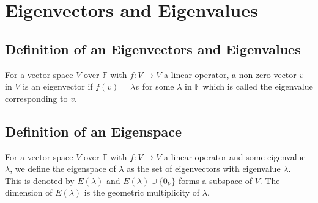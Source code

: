\documentclass[a4paper, 12pt, twoside]{article}
\begin{document}
\section{Eigenvectors and Eigenvalues}

\subsection{Definition of an Eigenvectors and Eigenvalues}

For a vector space $V$ over $\mathbb{F}$ with $f: V \to V$ a 
linear operator, a non-zero vector $v$ in $V$ is an eigenvector
if $f(v) = \lambda v$ for some $\lambda$ in $\mathbb{F}$ which is
called the eigenvalue corresponding to $v$.

\subsection{Definition of an Eigenspace}

For a vector space $V$ over $\mathbb{F}$ with $f: V \to V$ a 
linear operator and some eigenvalue $\lambda$, we define the
eigenspace of $\lambda$ as the set of eigenvectors with eigenvalue
$\lambda$.
\\[\baselineskip]
This is denoted by $E(\lambda)$ and $E(\lambda)\cup\{0_{V}\}$ forms
a subspace of $V$. The dimension of $E(\lambda)$ is the geometric
multiplicity of $\lambda$.
\end{document}
